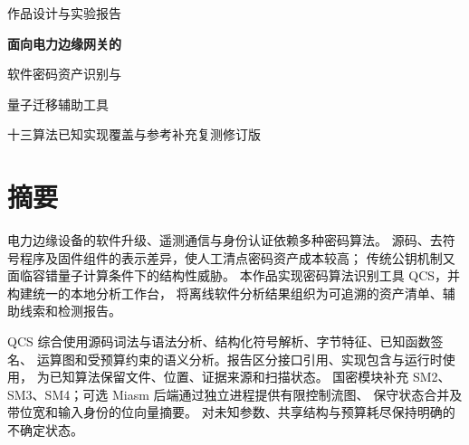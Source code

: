 \documentclass[UTF8,a4paper,11pt,titlepage,oneside]{ctexbook}
\begin{document}
\renewcommand{\contentsname}{目录}
\renewcommand{\listfigurename}{插图}
\renewcommand{\listtablename}{表格}
\tableofcontents
\listoffigures
\listoftables

\setlength{\emergencystretch}{3em}
\expandafter\def\expandafter\UrlBreaks\expandafter{\UrlBreaks
  \do\a\do\b\do\c\do\d\do\e\do\f\do\g\do\h\do\i\do\j\do\k\do\l\do\m\do\n\do\o\do\p\do\q\do\r\do\s\do\t\do\u\do\v\do\w\do\x\do\y\do\z\do\A\do\B\do\C\do\D\do\E\do\F\do\G\do\H\do\I\do\J\do\K\do\L\do\M\do\N\do\O\do\P\do\Q\do\R\do\S\do\T\do\U\do\V\do\W\do\X\do\Y\do\Z\do\0\do\1\do\2\do\3\do\4\do\5\do\6\do\7\do\8\do\9}

\begin{titlepage}\centering\vspace*{1.5cm}
  {\Large 作品设计与实验报告\par}\vspace{1.7cm}
  {\Huge\bfseries 面向电力边缘网关的\par 软件密码资产识别与\par 量子迁移辅助工具\par}
  \vspace{1.1cm}{\Large QCS 识别引擎与电力密码分析工作台\par}\vfill
  {\large 十三算法已知实现覆盖与参考补充复测修订版\par}
  \vspace{.6cm}{\large 2026 年 10 月 19 日\par}
  \vspace{.5cm}{\small 实现范围：Linux 软件分析与本地网页工作台\par}
\end{titlepage}
\chapter*{摘要}
电力边缘设备的软件升级、遥测通信与身份认证依赖多种密码算法。
源码、去符号程序及固件组件的表示差异，使人工清点密码资产成本较高；
传统公钥机制又面临容错量子计算条件下的结构性威胁。
本作品实现密码算法识别工具 QCS，并构建统一的本地分析工作台，
将离线软件分析结果组织为可追溯的资产清单、辅助线索和检测报告。

QCS 综合使用源码词法与语法分析、结构化符号解析、字节特征、已知函数签名、
运算图和受预算约束的语义分析。报告区分接口引用、实现包含与运行时使用，
为已知算法保留文件、位置、证据来源和扫描状态。
国密模块补充 SM2、SM3、SM4；可选 Miasm 后端通过独立进程提供有限控制流图、
保守状态合并及带位宽和输入身份的位向量摘要。
对未知参数、共享结构与预算耗尽保持明确的不确定状态。
\end{document}
